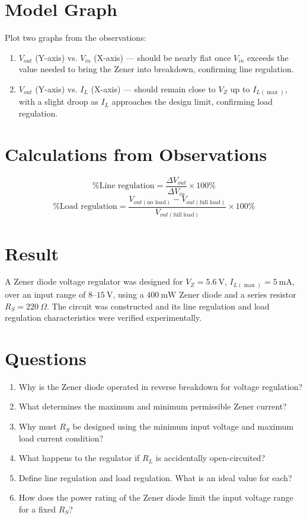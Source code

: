 \section{Model Graph}
Plot two graphs from the observations:
\begin{enumerate}
	\item $V_{out}$ (Y-axis) vs. $V_{in}$ (X-axis) — should be nearly flat once $V_{in}$ exceeds the value needed to bring the Zener into breakdown, confirming line regulation.
	\item $V_{out}$ (Y-axis) vs. $I_L$ (X-axis) — should remain close to $V_Z$ up to $I_{L(\max)}$, with a slight droop as $I_L$ approaches the design limit, confirming load regulation.
\end{enumerate}

\section{Calculations from Observations}
\[
\text{\% Line regulation} = \frac{\Delta V_{out}}{\Delta V_{in}} \times 100\%
\]
\[
\text{\% Load regulation} = \frac{V_{out(\text{no load})} - V_{out(\text{full load})}}{V_{out(\text{full load})}} \times 100\%
\]

\section{Result}
A Zener diode voltage regulator was designed for $V_Z = 5.6\ \text{V}$,
$I_{L(\max)} = 5\ \text{mA}$, over an input range of $8$--$15\ \text{V}$, using
a $400\ \text{mW}$ Zener diode and a series resistor $R_S = 220\ \Omega$. The
circuit was constructed and its line regulation and load regulation
characteristics were verified experimentally.

\section{Questions}
\begin{enumerate}
	\item Why is the Zener diode operated in reverse breakdown for voltage regulation?
	\item What determines the maximum and minimum permissible Zener current?
	\item Why must $R_S$ be designed using the minimum input voltage and maximum load current condition?
	\item What happens to the regulator if $R_L$ is accidentally open-circuited?
	\item Define line regulation and load regulation. What is an ideal value for each?
	\item How does the power rating of the Zener diode limit the input voltage range for a fixed $R_S$?
\end{enumerate}
